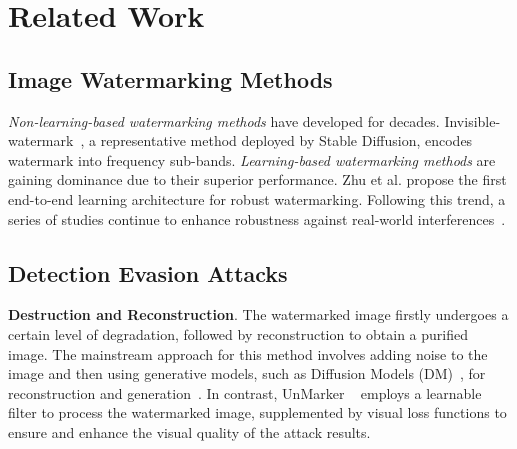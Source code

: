 \section{Related Work}
\subsection{Image Watermarking Methods}
\emph{Non-learning-based watermarking methods} have developed for decades. Invisible-watermark~\cite{invisible-watermark}, a representative method deployed by Stable Diffusion, encodes watermark into frequency sub-bands. \emph{Learning-based watermarking methods} are gaining dominance due to their superior performance. Zhu et al. \cite{zhu2018hidden} propose the first end-to-end learning architecture for robust watermarking. Following this trend, a series of studies continue to enhance robustness against real-world interferences~\cite{stegastamp, Liu2019TwoStage}. 




\subsection{Detection Evasion Attacks}
\textbf{Destruction and Reconstruction}. The watermarked image firstly undergoes a certain level of degradation, followed by reconstruction to obtain a purified image. The mainstream approach for this method involves adding noise to the image and then using generative models, such as Diffusion Models (DM)~\cite{ho2020denoising}, for reconstruction and generation~\cite{an2024benchmarking, saberi2023robustness, zhao2023invisible}. In contrast, UnMarker ~\cite{Kassis2024Unmarker} employs a learnable filter to process the watermarked image, supplemented by visual loss functions to ensure and enhance the visual quality of the attack results. 

